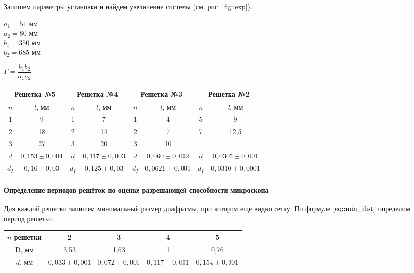 \documentclass[12pt]{article}
\begin{document}
	Запишем параметры установки и найдем увеличение системы (см. рис. \ref{fig::exp}).
	
	\begin{minipage}{.48\textwidth}
		$a_1 = 51$ мм\\
		$a_2 = 80$ мм\\
		$b_1 = 350$ мм\\
		$b_2 = 685$ мм\\
	\end{minipage}
	\hfill
	\begin{minipage}{.48\textwidth}
		$\Gamma = \dfrac{b_1b_2}{a_1a_2}$ \\
	\end{minipage}
	
	\begin{center}
	\begin{tabular}{|c|c||c|c||c|c||c|c|}
		\hline
		\multicolumn{2}{|c||}{Решетка №5} & \multicolumn{2}{|c||}{Решетка №4} & \multicolumn{2}{|c||}{Решетка №3} & \multicolumn{2}{|c|}{Решетка №2} \\
		\hline 
		$n$ & $l$, мм & $n$ & $l$, мм & $n$ & $l$, мм & $n$ & $l$, мм \\ 
		\hline 
		1 & 9 & 1 & 7 & 1 & 4 & 5 & 9 \\ 
		\hline 
		2 & 18 & 2 & 14 & 2 & 7 & 7 & 12,5 \\ 
		\hline 
		3 & 27 & 3 & 20 & 3 & 10 &  &  \\ 
		\hline 
		$d$ & $0,153\pm 0,004$ & $d$ & $0,117 \pm 0,003$ & $d$ & $0,060\pm 0,002$ & $d$ & $0,0305\pm 0,001$ \\ 
		\hline 
		$d_I$ & $0,16 \pm 0,03$ & $d_I$ & $0,125 \pm 0,03$ & $d_I$ & $0,0621 \pm 0,001$ & $d_I$ & $0,0310 \pm 0,0001$  \\ 
		\hline 
	\end{tabular} 
		\end{center}
	
	\paragraph{Определение периодов решёток по оценке разрешающей способности
		микроскопа}
	
	Для каждой решетки запишем минимальный размер диафрагмы, при котором еще видно \underline{сетку}.
	По формуле $\eqref{eq::min_dist}$ определим период решетки.
	\begin{center}
	\begin{tabular}{|c|c|c|c|c|}
		\hline 
		$n$ решетки & 2 & 3 & 4 & 5 \\ 
		\hline 
		D, мм & 3,53 & 1,63 & 1 & 0,76 \\ 
		\hline
		$d$, мм & $0,033 \pm 0,001$ & $0,072 \pm 0,001$&$0,117 \pm 0,001$ &$0,154 \pm 0,001$ \\
		\hline 
	\end{tabular}
	\end{center}
	
\end{document}
